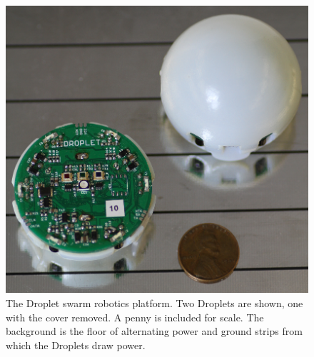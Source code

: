 \documentclass[letterpaper, 10pt, conference]{ieeeconf}
\begin{document}
\begin{figure}[!htb]
	\centering
		\includegraphics[width=0.8\columnwidth]{./Images/Droplets.png}
	\caption{The Droplet swarm robotics platform. Two Droplets are shown, one with the cover removed. A penny is included for scale. The background is the floor of alternating power and ground strips from which the Droplets draw power.}
	\label{Droplets}
\end{figure}
\end{document}
